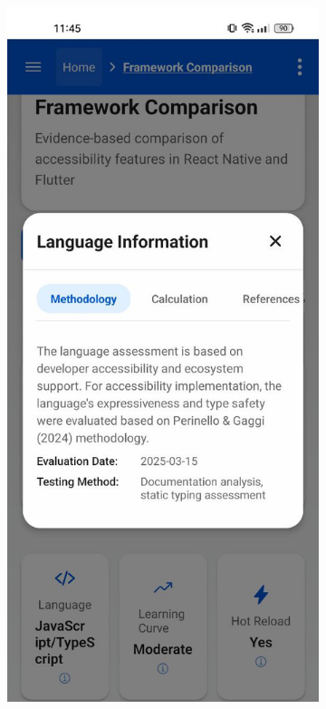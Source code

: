 \begin{figure}[ht]
    \centering
    \begin{subfigure}[b]{0.48\textwidth}
        \centering
        \includegraphics[width=\linewidth, alt={First part of Language in Overview tab of the Framework comparison screen}]{img/language-information.jpg}

\end{subfigure}
\end{figure}
